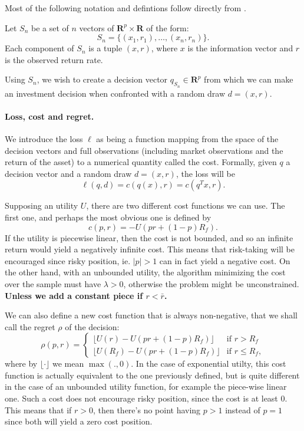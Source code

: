 \documentclass[11pt]{article}
\newcommand{\real}{\bm R}
\theoremstyle{plain}
\theoremstyle{definition}
\begin{document}
Most of the following notation and defintions follow directly from \cite{bousquet2002}.

Let $S_n$ be a set of $n$ vectors of $\real^p\times\real$ of the form:
\begin{equation}
  S_n = \{(x_1,r_1),\ldots,(x_n,r_n)\}.
\end{equation}
Each component of $S_n$ is a tuple $(x,r)$, where $x$ is the information vector and $r$ is
the observed return rate.

Using $S_n$, we wish to create a decision vector $q_{S_n}\in\real^p$ from which we can
make an investment decision when confronted with a random draw $d=(x,r)$.

\paragraph{Loss, cost and regret.}
We introduce the loss $\ell$ as being a function mapping from the space of the decision
vectors and full observations (including market observations and the return of the asset)
to a numerical quantity called the cost. Formally, given $q$ a decision vector and a
random draw $d=(x,r)$, the loss will be
\begin{equation}
\ell(q,d) = c(q(x),r) = c(q^Tx,r).
\end{equation}

Supposing an utility $U$, there are two different cost functions we can use. The first
one, and perhaps the most obvious one is defined by
\begin{equation}
  c(p,r) = -U(pr + (1-p)R_f).
\end{equation}
If the utility is piecewise linear, then the cost is not bounded, and so an infinite
return would yield a negatively infinite cost. This means that risk-taking will be
encouraged since risky position, ie. $|p|>1$ can in fact yield a negative cost. On the
other hand, with an unbounded utility, the algorithm minimizing the cost over the sample
must have $\lambda > 0$, otherwise the problem might be unconstrained. \textbf{Unless we
  add a constant piece if $r<\bar r$.}

We can also define a new cost function that is always non-negative, that we shall call the
regret $\rho$ of the decision:
\begin{equation}
  \rho(p,r) =
  \begin{cases}
    \lfloor U(r) - U(pr + (1-p)R_f)\rfloor & \text{if } r>R_f\\
    \lfloor U(R_f) - U(pr + (1-p)R_f)\rfloor &\text{if } r\leq R_f,
  \end{cases}
\end{equation}
where by $\lfloor \cdot \rfloor$ we mean $\max(.,0)$. In the case of exponential
utilty, this cost function is actually equivalent to the one previously defined, but is
quite different in the case of an unbounded utility function, for example the piece-wise
linear one. Such a cost does not encourage risky position, since the cost is at least
0. This means that if $r>0$, then there's no point having $p>1$ instead of $p=1$ since
both will yield a zero cost position. 
\end{document}
